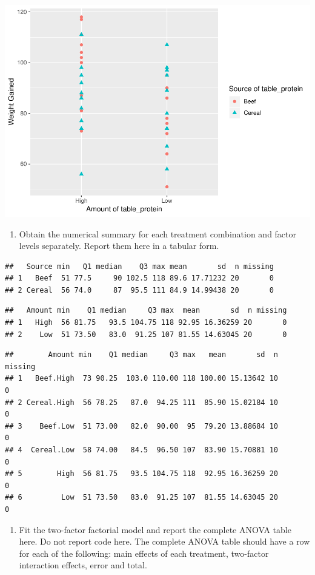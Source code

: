 \documentclass[11pt,]{article}
\providecommand{\tightlist}{%
\setlength{\itemsep}{0pt}\setlength{\parskip}{0pt}}
\begin{document}
\includegraphics[width=0.5\linewidth]{svm-rmarkdown-article-example_files/figure-latex/unnamed-chunk-3-1}

\begin{enumerate}
\def\labelenumi{(\alph{enumi})}
\setcounter{enumi}{1}
\tightlist
\item
  Obtain the numerical summary for each treatment combination and factor
  levels separately. Report them here in a tabular form.
\end{enumerate}

\begin{verbatim}
##   Source min   Q1 median    Q3 max mean       sd  n missing
## 1   Beef  51 77.5     90 102.5 118 89.6 17.71232 20       0
## 2 Cereal  56 74.0     87  95.5 111 84.9 14.99438 20       0
\end{verbatim}

\begin{verbatim}
##   Amount min    Q1 median     Q3 max  mean       sd  n missing
## 1   High  56 81.75   93.5 104.75 118 92.95 16.36259 20       0
## 2    Low  51 73.50   83.0  91.25 107 81.55 14.63045 20       0
\end{verbatim}

\begin{verbatim}
##        Amount min    Q1 median     Q3 max   mean       sd  n missing
## 1   Beef.High  73 90.25  103.0 110.00 118 100.00 15.13642 10       0
## 2 Cereal.High  56 78.25   87.0  94.25 111  85.90 15.02184 10       0
## 3    Beef.Low  51 73.00   82.0  90.00  95  79.20 13.88684 10       0
## 4  Cereal.Low  58 74.00   84.5  96.50 107  83.90 15.70881 10       0
## 5        High  56 81.75   93.5 104.75 118  92.95 16.36259 20       0
## 6         Low  51 73.50   83.0  91.25 107  81.55 14.63045 20       0
\end{verbatim}

\begin{enumerate}
\def\labelenumi{(\alph{enumi})}
\setcounter{enumi}{2}
\tightlist
\item
  Fit the two-factor factorial model and report the complete ANOVA table
  here. Do not report code here. The complete ANOVA table should have a
  row for each of the following: main effects of each treatment,
  two-factor interaction effects, error and total.
\end{enumerate}
\end{document}
